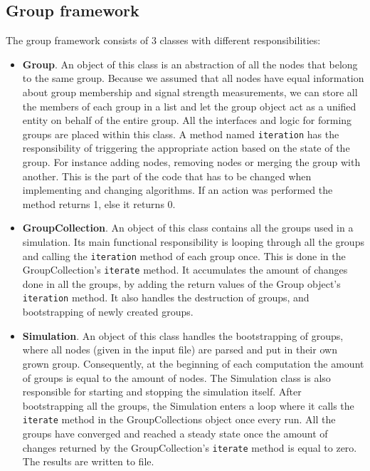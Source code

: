 \subsection{Group framework}
The group framework consists of 3 classes with different responsibilities:
\begin{itemize}
	\item \textbf{Group}. An object of this class is an abstraction of all the nodes that belong to the same group. Because we assumed that all nodes have equal
	information about group membership and signal strength measurements, we can store all the members of each group in a list and let the group object act as a unified entity on
	behalf of the entire group. All the interfaces and logic for forming groups are placed within this class. A method named \verb|iteration|
	has the responsibility of triggering the appropriate action based on the state of the group. For instance adding nodes, removing nodes or merging the group
	with another. This is the part of the code that has to be changed when implementing and changing algorithms. If an action was performed the method returns 1, else it returns 0. 

	\item \textbf{GroupCollection}. An object of this class contains all the groups used in a simulation. Its main functional responsibility is looping through all the groups
	and calling the \verb|iteration| method of each group once. This is done in the GroupCollection's \verb|iterate| method. It accumulates the amount of changes done in all the groups,
	by adding the return values of the Group object's \verb|iteration| method. It also handles the destruction of groups, and bootstrapping of newly created groups.

	\item \textbf{Simulation}. An object of this class handles the bootstrapping of groups, where all nodes (given in the input file) are parsed and
	put in their own grown group. Consequently, at the beginning of each computation the amount of groups is equal to the amount of nodes.
	The Simulation class is also responsible for starting and stopping the simulation itself. After bootstrapping all the groups, the Simulation enters a loop
	where it calls the \verb|iterate| method in the GroupCollections object once every run. All the groups have converged and reached a steady state 
	once the amount of changes returned by the GroupCollection's \verb|iterate| method is equal to zero. The results are written to file.
\end{itemize}

